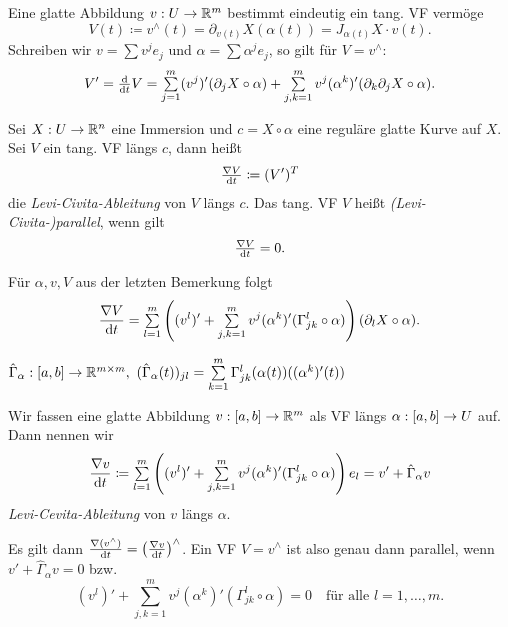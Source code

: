 \documentclass{cheat-sheet}
\begin{document}

\begin{bem}
  Eine glatte Abbildung $v : U \to \mathbb{R}^m$ bestimmt eindeutig ein tang. VF vermöge
  \[ V(t) \coloneqq v^\wedge(t) = \partial_{v(t)} X(\alpha(t)) = J_{\alpha(t)} X \cdot v(t). \]
  Schreiben wir $v = \sum v^j e_j$ und $\alpha = \sum \alpha^j e_j$, so gilt für $V = v^\wedge$:
  \[ V' = \tfrac{\d}{\d t} V = \sum_{j=1}^m (v^j)' (\partial_j X \circ \alpha) + \sum_{j,k=1}^m v^j (\alpha^k)' (\partial_k \partial_j X \circ \alpha). \]
\end{bem}


\begin{defn}
  Sei $X : U \to \mathbb{R}^n$ eine Immersion und $c = X \circ \alpha$ eine reguläre glatte Kurve auf $X$. Sei $V$ ein tang. VF längs $c$, dann heißt
  \[ \tfrac{\nabla V}{\mathrm{d} t} \coloneqq (V')^T \]
  die \emph{Levi-Civita-Ableitung} von $V$ längs $c$. Das tang. VF $V$ heißt \emph{(Levi-Civita-)parallel}, wenn gilt
  \[ \tfrac{\nabla V}{\mathrm{d} t} = 0. \]
\end{defn}

\begin{bem}
  Für $\alpha, v, V$ aus der letzten Bemerkung folgt
  \[ \frac{\nabla V}{\d t} = \sum_{l=1}^m \left( (v^l)' + \sum_{j,k=1}^m v^j (\alpha^k)' (\Gamma_{jk}^l \circ \alpha) \right) (\partial_l X \circ \alpha). \]
\end{bem}

\begin{nota}
  $\hat{\Gamma}_{\alpha} : \cinterval{a}{b} \to \R^{m \times m}, \,\, (\hat{\Gamma}_{\alpha}(t))_{jl} = \sum_{k=1}^m \Gamma_{jk}^l (\alpha(t))((\alpha^k)'(t))$
\end{nota}

\begin{defn}
  Wir fassen eine glatte Abbildung $v : \left[ a, b \right] \to \mathbb{R}^m$ als VF längs $\alpha : \left[ a, b \right] \to U$ auf. Dann nennen wir
  \[ \frac{\nabla v}{\d t} \coloneqq \sum_{l=1}^m \left( (v^l)' + \sum_{j,k=1}^m v^j (\alpha^k)' (\Gamma_{jk}^l \circ \alpha) \right) e_l = v' + \hat{\Gamma}_{\alpha} v \]
  \emph{Levi-Cevita-Ableitung} von $v$ längs $\alpha$.
\end{defn}

\begin{satz}
  Es gilt dann $\tfrac{\nabla (v^\wedge)}{\mathrm{d} t} = \left( \tfrac{\nabla v}{\mathrm{d} t} \right)^\wedge$. Ein VF $V = v^\wedge$ ist also genau dann parallel, wenn $v' + \hat{\Gamma}_\alpha v = 0$ bzw.
  \[ (v^l)' + \sum_{j,k=1}^m v^j (\alpha^k)' (\Gamma_{jk}^l \circ \alpha) = 0 \quad \text{für alle $l = 1, \ldots, m$.} \]
\end{satz}
\end{document}
